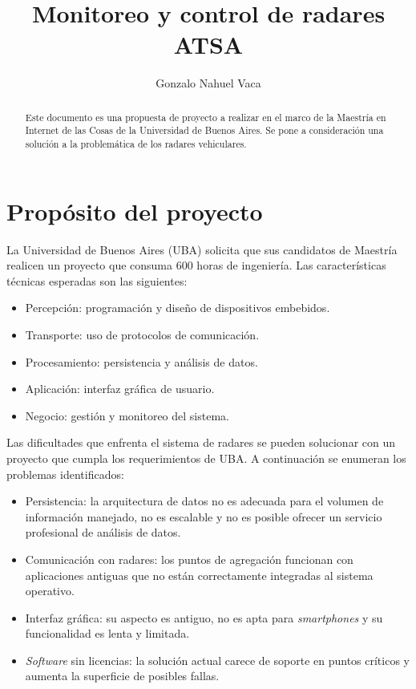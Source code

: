 \documentclass[
12pt,
spanish,
singlespacing,
parskip,
headsepline,]{article}
\title{Monitoreo y control de radares ATSA}
\author{Gonzalo Nahuel Vaca}
\begin{document}
\maketitle
\thispagestyle{empty}

\begin{abstract}

Este documento es una propuesta de proyecto a realizar en el marco de la Maestría en Internet de las Cosas de la Universidad de Buenos Aires. Se pone a consideración una solución a la problemática de los radares vehiculares.

\end{abstract}

\newpage

\tableofcontents

\newpage

\section{Propósito del proyecto}

La Universidad de Buenos Aires (UBA) solicita que sus candidatos de Maestría realicen un proyecto que consuma 600 horas de ingeniería.
Las características técnicas esperadas son las siguientes:

\begin{itemize}
	\item Percepción: programación y diseño de dispositivos embebidos.
	\item Transporte: uso de protocolos de comunicación.
	\item Procesamiento: persistencia y análisis de datos.
	\item Aplicación: interfaz gráfica de usuario.
	\item Negocio: gestión y monitoreo del sistema.
\end{itemize}

Las dificultades que enfrenta el sistema de radares se pueden solucionar con un proyecto que cumpla los requerimientos de UBA.
A continuación se enumeran los problemas identificados:

\begin{itemize}
	\item Persistencia: la arquitectura de datos no es adecuada para el volumen de información manejado, no es escalable y no es posible ofrecer un servicio profesional de análisis de datos.
	\item Comunicación con radares: los puntos de agregación funcionan con aplicaciones antiguas que no están correctamente integradas al sistema operativo.
	\item Interfaz gráfica: su aspecto es antiguo, no es apta para \emph{smartphones} y su funcionalidad es lenta y limitada.
	\item \emph{Software} sin licencias: la solución actual carece de soporte en puntos críticos y aumenta la superficie de posibles fallas.
\end{itemize}
\end{document}
